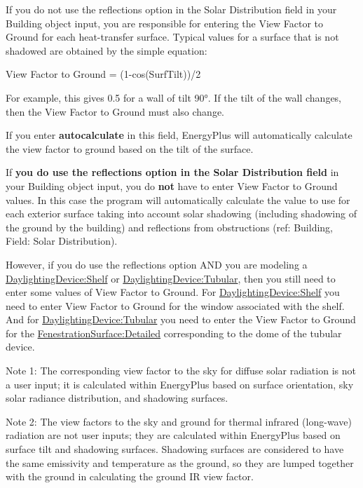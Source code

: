 If you do not use the reflections option in the Solar Distribution field in your Building object input, you are responsible for entering the View Factor to Ground for each heat-transfer surface. Typical values for a surface that is not shadowed are obtained by the simple equation:

View Factor to Ground = (1-cos(SurfTilt))/2

For example, this gives 0.5 for a wall of tilt 90°. If the tilt of the wall changes, then the View Factor to Ground must also change.

If you enter \textbf{autocalculate} in this field, EnergyPlus will automatically calculate the view factor to ground based on the tilt of the surface.

If \textbf{you do use the reflections option in the Solar Distribution field} in your Building object input, you do \textbf{not} have to enter View Factor to Ground values. In this case the program will automatically calculate the value to use for each exterior surface taking into account solar shadowing (including shadowing of the ground by the building) and reflections from obstructions (ref: Building, Field: Solar Distribution).

However, if you do use the reflections option AND you are modeling a \hyperref[daylightingdeviceshelf]{DaylightingDevice:Shelf} or \hyperref[daylightingdevicetubular]{DaylightingDevice:Tubular}, then you still need to enter some values of View Factor to Ground. For \hyperref[daylightingdeviceshelf]{DaylightingDevice:Shelf} you need to enter View Factor to Ground for the window associated with the shelf. And for \hyperref[daylightingdevicetubular]{DaylightingDevice:Tubular} you need to enter the View Factor to Ground for the \hyperref[fenestrationsurfacedetailed]{FenestrationSurface:Detailed} corresponding to the dome of the tubular device.

Note 1: The corresponding view factor to the sky for diffuse solar radiation is not a user input; it is calculated within EnergyPlus based on surface orientation, sky solar radiance distribution, and shadowing surfaces.

Note 2: The view factors to the sky and ground for thermal infrared (long-wave) radiation are not user inputs; they are calculated within EnergyPlus based on surface tilt and shadowing surfaces. Shadowing surfaces are considered to have the same emissivity and temperature as the ground, so they are lumped together with the ground in calculating the ground IR view factor.

